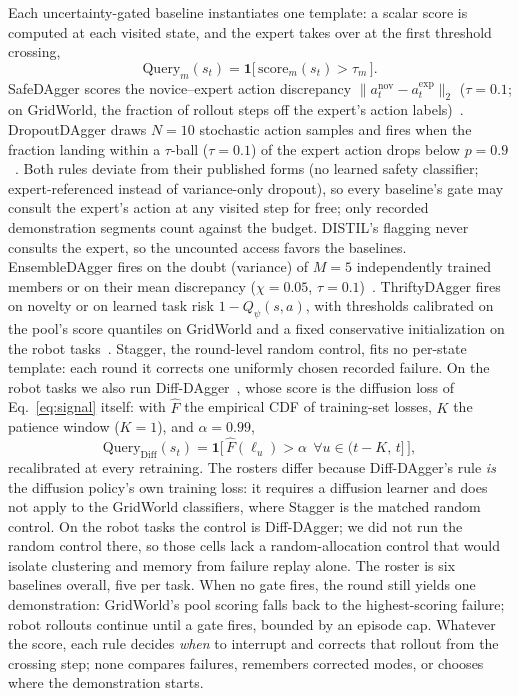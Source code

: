\documentclass[letterpaper]{article} %
\begin{document}
Each uncertainty-gated baseline instantiates one template: a scalar score is computed at each
visited state, and the expert takes over at the first threshold crossing,
\begin{equation}
\mathrm{Query}_m(s_t)=\mathbf{1}\big[\,\mathrm{score}_m(s_t)>\tau_m\,\big].
\label{eq:query}
\end{equation}
SafeDAgger scores the novice--expert action discrepancy
$\|a^{\mathrm{nov}}_t-a^{\mathrm{exp}}_t\|_2$ ($\tau{=}0.1$;
on GridWorld, the fraction of rollout steps off the expert's action
labels)~\citep{zhang2017safedagger}. DropoutDAgger draws
$N{=}10$ stochastic action samples and fires when the fraction landing
within a $\tau$-ball ($\tau{=}0.1$) of the expert action drops below
$p{=}0.9$~\citep{menda2017dropoutdagger,gal2016dropout}. Both rules deviate
from their published forms (no learned safety classifier; expert-referenced
instead of variance-only dropout), so every baseline's gate may consult the
expert's action at any visited step for free; only recorded demonstration
segments count against the budget. DISTIL's flagging never consults the
expert, so the uncounted access favors the baselines.
EnsembleDAgger fires on the doubt (variance) of $M{=}5$ independently trained
members or on their mean discrepancy ($\chi{=}0.05$,
$\tau{=}0.1$)~\citep{menda2019ensembledagger,lakshminarayanan2017ensembles}.
ThriftyDAgger fires on novelty or on learned task risk $1-Q_\psi(s,a)$, with
thresholds calibrated on the pool's score quantiles on GridWorld and a fixed
conservative initialization on the robot
tasks~\citep{hoque2021thriftydagger}. Stagger, the round-level random
control, fits no per-state template: each round it corrects one uniformly
chosen recorded failure. On the robot tasks we also run
Diff-DAgger~\citep{lee2025diffdagger}, whose score is the diffusion loss of
Eq.~\ref{eq:signal} itself: with $\hat F$ the empirical CDF of training-set
losses, $K$ the patience window ($K{=}1$), and $\alpha{=}0.99$,
\begin{equation}
\mathrm{Query}_{\mathrm{Diff}}(s_t)=
\mathbf{1}\big[\,\hat F(\ell_u)>\alpha\ \ \forall u\in(t{-}K,\,t]\,\big],
\label{eq:diffdagger}
\end{equation}
recalibrated at every retraining. The rosters differ because Diff-DAgger's
rule \emph{is} the diffusion policy's own training loss: it requires a
diffusion learner and does not apply to the GridWorld classifiers, where
Stagger is the matched random control. On the robot tasks the control is
Diff-DAgger; we did not run the random control there, so those cells lack
a random-allocation control that would isolate clustering and memory from
failure replay alone. The roster is six baselines overall, five per task.
When no
gate fires, the round still yields one demonstration: GridWorld's pool
scoring falls back to the highest-scoring failure; robot rollouts continue
until a gate fires, bounded by an episode cap. Whatever the score, each
rule decides \emph{when} to interrupt
and corrects that rollout from the crossing step; none compares failures,
remembers corrected modes, or chooses where the demonstration starts.
\end{document}
